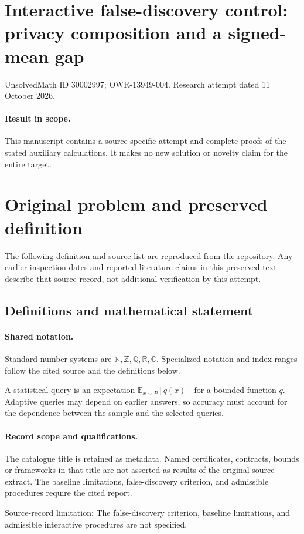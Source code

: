 \documentclass[11pt]{article}
\begin{document}
\section*{Interactive false-discovery control: privacy composition and a signed-mean gap}
\noindent UnsolvedMath ID 30002997; OWR-13949-004. Research attempt dated 11 October 2026.
\paragraph{Result in scope.}This manuscript contains a source-specific attempt and complete proofs of the stated auxiliary calculations. It makes no new solution or novelty claim for the entire target.
\section{Original problem and preserved definition}
The following definition and source list are reproduced from the repository. Any earlier inspection dates and reported literature claims in this preserved text describe that source record, not additional verification by this attempt.
\subsection{Definitions and mathematical statement}

\paragraph{Shared notation.}Standard number systems are $\mathbb N,\mathbb Z,\mathbb Q,\mathbb R,\mathbb C$. Specialized notation and index ranges follow the cited source and the definitions below.


A statistical query is an expectation $\mathbb E_{x\sim P}[q(x)]$ for a bounded function $q$. Adaptive queries may depend on earlier answers, so accuracy must account for the dependence between the sample and the selected queries.
\paragraph{Record scope and qualifications.}
The catalogue title is retained as metadata. Named certificates, contracts, bounds or frameworks in that title are not asserted as results of the original source extract.
The baseline limitations, false-discovery criterion, and admissible procedures require the cited report.

Source-record limitation: The false-discovery criterion, baseline limitations, and admissible interactive procedures are not specified.
\end{document}
